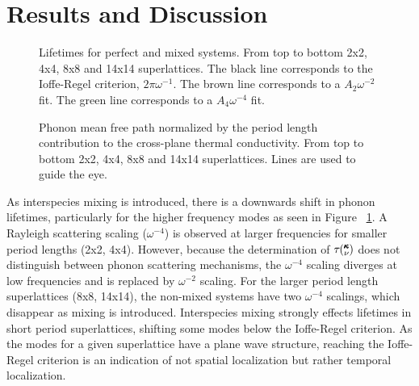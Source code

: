 \section{Results and Discussion}



\renewcommand{\textfraction}{0.0}
\begin{figure}%
\begin{center}
\renewcommand{\figure}{Fig.}
\caption{Lifetimes for perfect and mixed systems. From top to bottom 2x2, 4x4, 8x8 and 14x14 superlattices. The black line corresponds to the Ioffe-Regel criterion, $2\pi\omega^{-1}$. The brown line corresponds to a $A_2\omega^{-2}$ fit. The green line corresponds to a $A_4\omega^{-4}$ fit.}
\label{FIG:lifetime}
\end{center}
\end{figure}

\begin{figure}%
\begin{center}
\renewcommand{\figure}{Fig.}
\caption{Phonon mean free path normalized by the period length contribution to the cross-plane thermal conductivity. From top to bottom 2x2, 4x4, 8x8 and 14x14 superlattices. Lines are used to guide the eye.}
\label{FIG:MFP_cp}
\end{center}
\end{figure}

As interspecies mixing is introduced, there is a downwards shift in phonon lifetimes, particularly for the higher frequency modes as seen in Figure ~\ref{FIG:lifetime}. A Rayleigh scattering scaling ($\omega^{-4}$) is observed at larger frequencies for smaller period lengths (2x2, 4x4). However, because the determination of $\tau\mspace{-4.0mu}\left(\mspace{-8.0mu} \begin{smallmatrix}&\pmb{\kappa} \\&\nu\end{smallmatrix} \mspace{-3.0mu}\right)$ does not distinguish between phonon scattering mechanisms, the $\omega^{-4}$ scaling diverges at low frequencies and is replaced by $\omega^{-2}$ scaling. For the larger period length superlattices (8x8, 14x14), the non-mixed systems have two $\omega^{-4}$ scalings, which disappear as mixing is introduced. Interspecies mixing strongly effects lifetimes in short period superlattices, shifting some modes below the Ioffe-Regel criterion. As the modes for a given superlattice have a plane wave structure, reaching the Ioffe-Regel criterion is an indication of not spatial localization but rather temporal localization.

